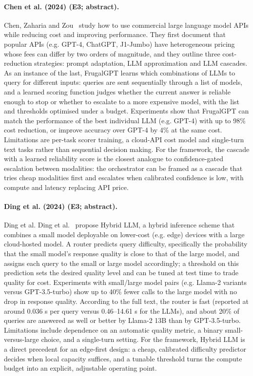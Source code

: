 \documentclass[10pt,a4paper]{article}
\begin{document}
\paragraph{Chen et al. (2024) (E3; abstract).} Chen, Zaharia and Zou~\cite{Chen2024} study how to use commercial large language model APIs while reducing cost and improving performance. They first document that popular APIs (e.g. GPT-4, ChatGPT, J1-Jumbo) have heterogeneous pricing whose fees can differ by two orders of magnitude, and they outline three cost-reduction strategies: prompt adaptation, LLM approximation and LLM cascades. As an instance of the last, FrugalGPT learns which combinations of LLMs to query for different inputs: queries are sent sequentially through a list of models, and a learned scoring function judges whether the current answer is reliable enough to stop or whether to escalate to a more expensive model, with the list and thresholds optimised under a budget. Experiments show that FrugalGPT can match the performance of the best individual LLM (e.g. GPT-4) with up to 98\% cost reduction, or improve accuracy over GPT-4 by 4\% at the same cost. Limitations are per-task scorer training, a cloud-API cost model and single-turn text tasks rather than sequential decision making. For the framework, the cascade with a learned reliability score is the closest analogue to confidence-gated escalation between modalities: the orchestrator can be framed as a cascade that tries cheap modalities first and escalates when calibrated confidence is low, with compute and latency replacing API price.

\paragraph{Ding et al. (2024) (E3; abstract).} Ding et al. Ding et al.~\cite{Ding2024} propose Hybrid LLM, a hybrid inference scheme that combines a small model deployable on lower-cost (e.g. edge) devices with a large cloud-hosted model. A router predicts query difficulty, specifically the probability that the small model's response quality is close to that of the large model, and assigns each query to the small or large model accordingly; a threshold on this prediction sets the desired quality level and can be tuned at test time to trade quality for cost. Experiments with small/large model pairs (e.g. Llama-2 variants versus GPT-3.5-turbo) show up to 40\% fewer calls to the large model with no drop in response quality. According to the full text, the router is fast (reported at around 0.036 s per query versus 0.46--14.61 s for the LLMs), and about 20\% of queries are answered as well or better by Llama-2 13B than by GPT-3.5-turbo. Limitations include dependence on an automatic quality metric, a binary small-versus-large choice, and a single-turn setting. For the framework, Hybrid LLM is a direct precedent for an edge-first design: a cheap, calibrated difficulty predictor decides when local capacity suffices, and a tunable threshold turns the compute budget into an explicit, adjustable operating point.
\end{document}
